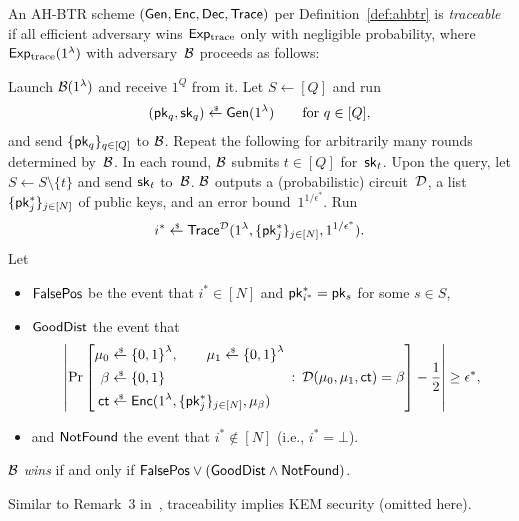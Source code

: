 \begin{definition}[traceability]\label{def:tracing-security}
An AH-BTR scheme $(\Gen,\Enc,\Dec,\Trace)$ per Definition~\ref{def:ahbtr} is \emph{traceable}
if all efficient adversary wins $\ExpTrace$ only with negligible probability,
where $\ExpTrace(1^\lambda)$ with adversary~${\mathcal{B}}$ proceeds as follows:
\begin{security}
Launch ${\mathcal{B}}(1^\lambda)$ and receive $1^Q$ from it.
Let ${S\gets[Q]}$ and run
\begin{align*}
(\pk_q,\sk_q)\draws\Gen(1^\lambda)\qquad\textup{for }q\in[Q],
\end{align*}
and send $\{\pk_q\}_{q\in[Q]}$ to ${\mathcal{B}}$.
Repeat the following for arbitrarily many rounds determined by~${\mathcal{B}}$.
In each round, ${\mathcal{B}}$ submits ${t\in[Q]}$ for~$\sk_t$.
Upon the query, let ${S\gets S\setminus\{t\}}$ and send $\sk_t$ to~${\mathcal{B}}$.
${\mathcal{B}}$ outputs a (probabilistic) circuit~${\mathcal{D}}$,
a list $\{\pk^\ast_j\}_{j\in[N]}$ of public keys, and
an error bound~$1^{1/\epsilon^\ast}$.
Run
\begin{align*}
i^\ast\draws\Trace^\scriptD(1^\lambda,\{\pk^\ast_j\}_{j\in[N]},1^{1/\epsilon^\ast}).
\end{align*}
Let
\begin{itemize}
\item $\FalsePos$ be the event that ${i^\ast\in[N]}$ and ${\pk^\ast_{i^\ast}=\pk_s}$ for some ${s\in S}$,
\item $\GoodDist$ the event that
\begin{align*}
\left|\Pr\left[
\begin{aligned}
\mu_0&{}\draws\bit^\lambda,\qquad
\mu_1\draws\bit^\lambda\\
\beta&{}\draws\bit\\
\ct&{}\draws\Enc(1^\lambda,\{\pk^\ast_j\}_{j\in[N]},\mu_\beta)
\end{aligned}
\::\:
\scriptD(\mu_0,\mu_1,\ct)=\beta
\right]-\frac12
\right|
\geq\epsilon^\ast,
\end{align*}
\item and
$\NotFound$ the event that ${i^\ast\notin[N]}$ (i.e., ${i^\ast=\bot}$).
\end{itemize}
${\mathcal{B}}$ \emph{wins} if and only if ${\FalsePos\vee(\GoodDist\wedge\NotFound)}$.
\end{security}
\end{definition}

\noindent
Similar to Remark~3 in~\cite{EPRINT:Zhandry20a},
traceability implies KEM security (omitted here).

